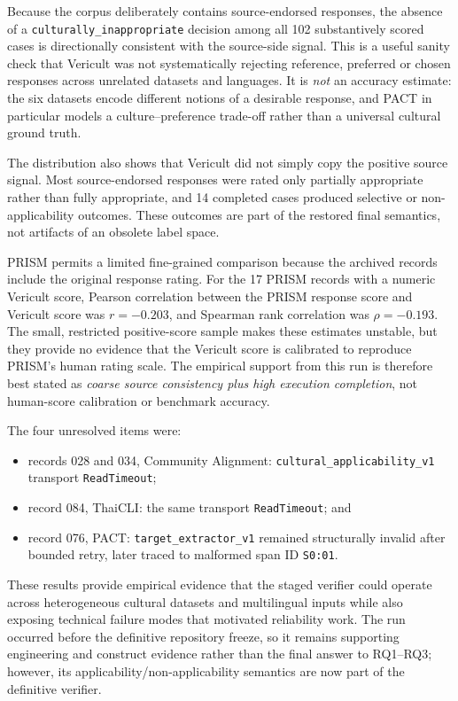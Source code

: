 Because the corpus deliberately contains source-endorsed responses, the absence of a \texttt{culturally\_inappropriate} decision among all 102 substantively scored cases is directionally consistent with the source-side signal. This is a useful sanity check that Vericult was not systematically rejecting reference, preferred or chosen responses across unrelated datasets and languages. It is \emph{not} an accuracy estimate: the six datasets encode different notions of a desirable response, and PACT in particular models a culture--preference trade-off rather than a universal cultural ground truth.

The distribution also shows that Vericult did not simply copy the positive source signal. Most source-endorsed responses were rated only partially appropriate rather than fully appropriate, and 14 completed cases produced selective or non-applicability outcomes. These outcomes are part of the restored final semantics, not artifacts of an obsolete label space.

PRISM permits a limited fine-grained comparison because the archived records include the original response rating. For the 17 PRISM records with a numeric Vericult score, Pearson correlation between the PRISM response score and Vericult score was $r=-0.203$, and Spearman rank correlation was $\rho=-0.193$. The small, restricted positive-score sample makes these estimates unstable, but they provide no evidence that the Vericult score is calibrated to reproduce PRISM's human rating scale. The empirical support from this run is therefore best stated as \emph{coarse source consistency plus high execution completion}, not human-score calibration or benchmark accuracy.

The four unresolved items were:
\begin{itemize}
    \item records 028 and 034, Community Alignment: \texttt{cultural\_applicability\_v1} transport \texttt{ReadTimeout};
    \item record 084, ThaiCLI: the same transport \texttt{ReadTimeout}; and
    \item record 076, PACT: \texttt{target\_extractor\_v1} remained structurally invalid after bounded retry, later traced to malformed span ID \texttt{S0:01}.
\end{itemize}

These results provide empirical evidence that the staged verifier could operate across heterogeneous cultural datasets and multilingual inputs while also exposing technical failure modes that motivated reliability work. The run occurred before the definitive repository freeze, so it remains supporting engineering and construct evidence rather than the final answer to RQ1--RQ3; however, its applicability/non-applicability semantics are now part of the definitive verifier.

